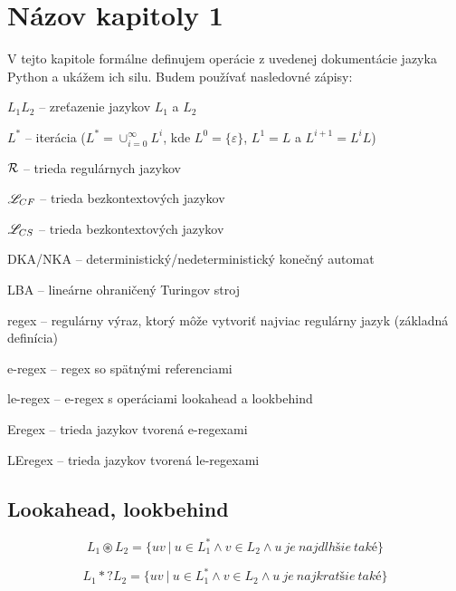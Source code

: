 \chapter{Názov kapitoly 1}
\label{chap:kapitola1}

V tejto kapitole formálne definujem operácie z uvedenej dokumentácie jazyka Python \cite{Python3Documentation} a ukážem ich silu. Budem používať nasledovné zápisy:
\begin{list}{}{}
\item $ L_{1}L_{2} $ -- zreťazenie jazykov $ L_{1} $ a $ L_{2} $
\item $ L^* $ -- iterácia ($L^*=\cup^{\infty}_{i=0}L^i$, kde $L^0=\lbrace \varepsilon \rbrace$, $L^1=L$ a $L^{i+1}=L^iL$)
\item $ {\cal R} $ -- trieda regulárnych jazykov
\item $ \mathscr{L}_{CF}$ -- trieda bezkontextových jazykov
\item $ \mathscr{L}_{CS}$ -- trieda bezkontextových jazykov
\item DKA/NKA -- deterministický/nedeterministický konečný automat
\item LBA -- lineárne ohraničený Turingov stroj
\item regex -- regulárny výraz, ktorý môže vytvoriť najviac regulárny jazyk (základná definícia)
\item e-regex -- regex so spätnými referenciami
\item le-regex -- e-regex s operáciami lookahead a lookbehind
\item Eregex -- trieda jazykov tvorená e-regexami
\item LEregex -- trieda jazykov tvorená le-regexami
\end{list}

\section{Lookahead, lookbehind}
\label{chap:lookahead}

\begin{df}
$$ L_{1} \circledast L_{2} = \lbrace uv ~|~ u \in L_1^* \land v \in L_2 \land u~je~najdlhšie~také \rbrace$$
\end{df}

\begin{df}
$$ L_{1} *? L_{2} = \lbrace uv ~|~ u \in L_1^* \land v \in L_2 \land u~je~najkratšie~také \rbrace $$
\end{df}


